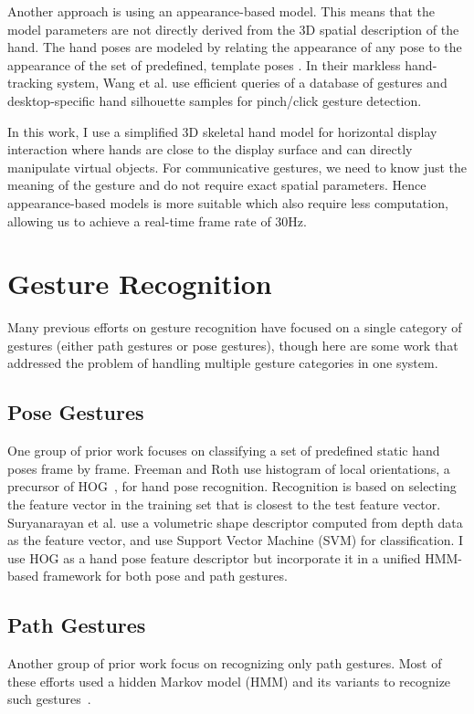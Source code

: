 Another approach is using an appearance-based model. This means that the model
parameters are not directly derived from the 3D spatial description of the hand.
The hand poses are modeled by relating the appearance of any pose to the 
appearance of the set of predefined, template poses \cite{Pavlovic97}. In
their markless hand-tracking system, Wang et al. \cite{wang11} use efficient
queries of a database of gestures and desktop-specific hand silhouette samples
for pinch/click gesture detection.

In this work, I use a simplified 3D
skeletal hand model for horizontal display interaction where hands are close
to the display surface and can directly manipulate virtual objects.
For communicative gestures, we need to know just the meaning of the gesture
and do not require exact spatial parameters. Hence appearance-based models
is more suitable which also require less computation, allowing us to achieve
a real-time frame rate of 30Hz.

\section{Gesture Recognition}
Many previous efforts on gesture recognition have focused on a single category
of gestures (either path gestures or pose gestures), though here are some work that
addressed the problem of handling multiple gesture categories in one system.

\subsection{Pose Gestures}
One group of prior work focuses on classifying a set of predefined static hand
poses frame by frame. Freeman and Roth \cite{freeman95} use histogram of local
orientations, a precursor of HOG~\cite{dalal05},
for hand pose recognition.
Recognition is based on selecting the feature vector in the training set that is closest to the test feature vector. 
Suryanarayan et al.
\cite{suryanarayan2010} use a volumetric shape descriptor computed from depth
data as the feature vector, and use Support Vector Machine (SVM) for
classification.
I use HOG as a hand pose feature descriptor but incorporate it in a unified HMM-based framework for both pose and path gestures.

\subsection{Path Gestures}
Another group of prior work focus on recognizing only path gestures. 
Most of these efforts used a hidden Markov model (HMM) and its variants to
recognize such gestures~\cite{Starner95, sharma00}.

